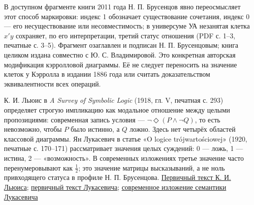 \documentclass[12pt,a4paper]{article}
\begin{document}
В доступном фрагменте книги 2011 года Н. П. Брусенцов явно переосмысляет этот способ маркировки: индекс 1 обозначает существование сочетания, индекс 0 — его несуществование или несовместимость; в универсуме УА незанятая клетка \(x'y\) сохраняет, по его интерпретации, третий статус отношения (PDF с. 1–3, печатные с. 3–5). Фрагмент озаглавлен и подписан Н. П. Брусенцовым; книга целиком издана совместно с Ю. С. Владимировой. Это конкретная авторская модификация кэрролловой диаграммы. Её не следует переносить на значение клеток у Кэрролла в издании 1886 года или считать доказательством эквивалентности всех операций.

К. И. Льюис в \emph{A Survey of Symbolic Logic} (1918, гл. V, печатная с. 293) определяет строгую импликацию как модальное отношение между целыми пропозициями: современная запись условия — \(\neg\Diamond(P\land\neg Q)\), то есть невозможно, чтобы \(P\) было истинно, а \(Q\) ложно. Здесь нет четырёх областей классовой диаграммы. Ян Лукасевич в статье «O logice trójwartościowej» (1920, печатные с. 170–171) рассматривает значения целых суждений: 0 — ложь, 1 — истина, 2 — «возможность». В современных изложениях третье значение часто перенумеровывают как \(\tfrac12\); это значение матрицы высказываний, а не ноль привходящего статуса в профиле Н. П. Брусенцова. \href{https://archive.org/details/surveyofsymbolic00lewiiala}{Первичный текст К. И. Льюиса}; \href{https://kpbc.umk.pl/Content/247342/PDF/EOD_OPEN_006_12_nr_09.pdf}{первичный текст Лукасевича}; \href{https://plato.stanford.edu/entries/lukasiewicz/}{современное изложение семантики Лукасевича}
\end{document}
